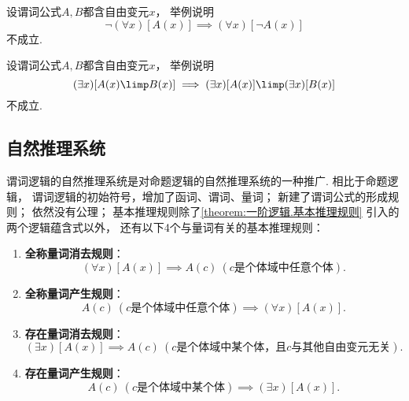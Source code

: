 \begin{example}
设谓词公式\(A,B\)都含自由变元\(x\)，
举例说明\begin{equation*}
	\neg(\forall x)[A(x)] \implies (\forall x)[\neg A(x)]
\end{equation*}不成立.
\end{example}

\begin{example}
设谓词公式\(A,B\)都含自由变元\(x\)，
举例说明\begin{equation*}
	(\exists x)[A(x) \limp B(x)] \implies (\exists x)[A(x)] \limp (\exists x)[B(x)]
\end{equation*}不成立.
\end{example}

\subsection{自然推理系统}
谓词逻辑的自然推理系统是对命题逻辑的自然推理系统的一种推广.
相比于命题逻辑，
谓词逻辑的初始符号，增加了函词、谓词、量词；
新建了谓词公式的形成规则；
依然没有公理；
基本推理规则除了\cref{theorem:一阶逻辑.基本推理规则} 引入的两个逻辑蕴含式以外，
还有以下4个与量词有关的基本推理规则：\begin{enumerate}
	\item {\rm\bf 全称量词消去规则}：\begin{equation*}
		(\forall x)[A(x)] \implies A(c)\ (\text{$c$是个体域中任意个体}).
	\end{equation*}

	\item {\rm\bf 全称量词产生规则}：\begin{equation*}
		A(c)\ (\text{$c$是个体域中任意个体}) \implies (\forall x)[A(x)].
	\end{equation*}

	\item {\rm\bf 存在量词消去规则}：\begin{equation*}
		(\exists x)[A(x)] \implies A(c)\ (\text{$c$是个体域中某个体，且$c$与其他自由变元无关}).
	\end{equation*}

	\item {\rm\bf 存在量词产生规则}：\begin{equation*}
		A(c)\ (\text{$c$是个体域中某个体}) \implies (\exists x)[A(x)].
	\end{equation*}
\end{enumerate}

